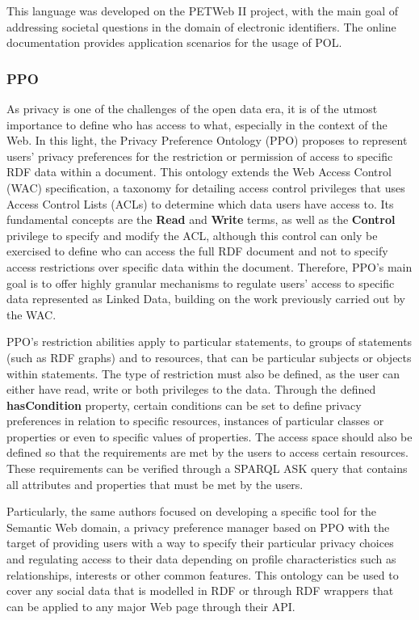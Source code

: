 This language was developed on the PETWeb II project, with the main goal of addressing societal questions in the domain of electronic identifiers.
The online documentation provides application scenarios for the usage of POL.

\subsubsection{PPO}
\label{sec:ppo}

As privacy is one of the challenges of the open data era, it is of the utmost importance to define who has access to what, especially in the context of the Web.
In this light, the Privacy Preference Ontology (PPO) \citep{sacco_privacy_2011} proposes to represent users' privacy preferences for the restriction or permission of access to specific RDF data within a document.
This ontology extends the Web Access Control (WAC) specification, a taxonomy for detailing access control privileges that uses Access Control Lists (ACLs) to determine which data users have access to.
Its fundamental concepts are the \textbf{Read} and \textbf{Write} terms, as well as the \textbf{Control} privilege to specify and modify the ACL, although this control can only be exercised to define who can access the full RDF document and not to specify access restrictions over specific data within the document.
Therefore, PPO's main goal is to offer highly granular mechanisms to regulate users' access to specific data represented as Linked Data, building on the work previously carried out by the WAC.

PPO's restriction abilities apply to particular statements, to groups of statements (such as RDF graphs) and to resources, that can be particular subjects or objects within statements.
The type of restriction must also be defined, as the user can either have read, write or both privileges to the data.
Through the defined \textbf{hasCondition} property, certain conditions can be set to define privacy preferences in relation to specific resources, instances of particular classes or properties or even to specific values of properties.
The access space should also be defined so that the requirements are met by the users to access certain resources.
These requirements can be verified through a SPARQL ASK query that contains all attributes and properties that must be met by the users.

Particularly, the same authors focused on developing a specific tool for the Semantic Web domain, a privacy preference manager \citep{sacco_privacy_2011b} based on PPO with the target of providing users with a way to specify their particular privacy choices and regulating access to their data depending on profile characteristics such as relationships, interests or other common features.
This ontology can be used to cover any social data that is modelled in RDF or through RDF wrappers that can be applied to any major Web page through their API.

